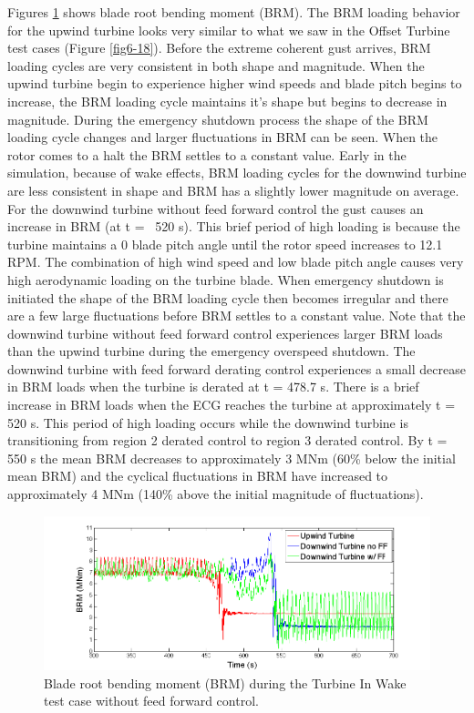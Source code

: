 Figures \ref{fig6-31} shows blade root bending moment (BRM). The BRM loading behavior for the upwind turbine looks very similar to what we saw in the Offset Turbine test cases (Figure \ref{fig6-18}). Before the extreme coherent gust arrives, BRM loading cycles are very consistent in both shape and magnitude. When the upwind turbine begin to experience higher wind speeds and blade pitch begins to increase, the BRM loading cycle maintains it's shape but begins to decrease in magnitude. During the emergency shutdown process the shape of the BRM loading cycle changes and larger fluctuations in BRM can be seen. When the rotor comes to a halt the BRM settles to a constant value. Early in the simulation, because of wake effects, BRM loading cycles for the downwind turbine are less consistent in shape and BRM has a slightly lower magnitude on average. For the downwind turbine without feed forward control the gust causes an increase in BRM (at t = ~520 s). This brief period of high loading is because the turbine maintains a 0\degree{} blade pitch angle until the rotor speed increases to 12.1 RPM. The combination of high wind speed and low blade pitch angle causes very high aerodynamic loading on the turbine blade. When emergency shutdown is initiated the shape of the BRM loading cycle then becomes irregular and there are a few large fluctuations before BRM settles to a constant value. Note that the downwind turbine without feed forward control experiences larger BRM loads than the upwind turbine during the emergency overspeed shutdown. The downwind turbine with feed forward derating control experiences a small decrease in BRM loads when the turbine is derated at t = 478.7 s. There is a brief increase in BRM loads when the ECG reaches the turbine at approximately t = 520 s. This period of high loading occurs while the downwind turbine is transitioning from region 2 derated control to region 3 derated control. By t = 550 s the mean BRM decreases to approximately 3 MNm (60\% below the initial mean BRM) and the cyclical fluctuations in BRM have increased to approximately 4 MNm (140\% above the initial magnitude of fluctuations).

\begin{figure}[ht] 
	\centering
		\includegraphics[width = \linewidth]{Figures/ch6Figures/fig6-31.png}

	\caption{Blade root bending moment (BRM) during the Turbine In Wake test case without feed forward control.}
	\label{fig6-31}
\end{figure}

